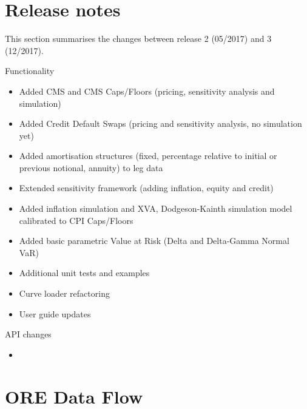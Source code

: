 \documentclass[12pt, a4paper]{article}
\begin{document}
\section{Release notes}\label{sec:releasenotes}

This section summarises the changes between release 2 (05/2017) and 3 (12/2017).

\medskip
Functionality 
\begin{itemize}
\item Added CMS and CMS Caps/Floors (pricing, sensitivity analysis and simulation)
\item Added Credit Default Swaps (pricing and sensitivity analysis, no simulation yet)
\item Added amortisation structures (fixed, percentage relative to initial or previous notional, annuity) to leg data
\item Extended sensitivity framework (adding inflation, equity and credit) 
\item Added inflation simulation and XVA, Dodgeson-Kainth simulation model calibrated to CPI Caps/Floors
\item Added basic parametric Value at Risk (Delta and Delta-Gamma Normal VaR)
\item Additional unit tests and examples
\item Curve loader refactoring
\item User guide updates
\end{itemize}

\medskip
API changes
\begin{itemize}
\item 
\end{itemize}


\section{ORE Data Flow}\label{sec:process}
\end{document}
